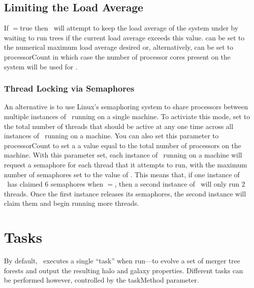 \subsection{Limiting the Load Average}

If {\normalfont \ttfamily [treeEvolveLimitLoadAverage]}$=${\normalfont \ttfamily true} then \glc\ will attempt to keep the load average of the system under {\normalfont \ttfamily [treeEvolveLoadAverageMaximum]} by waiting to run trees if the current load average exceeds this value. {\normalfont \ttfamily [treeEvolveLoadAverageMaximum]} can be set to the numerical maximum load average desired or, alternatively, can be set to {\normalfont \ttfamily processorCount} in which case the number of processor cores present on the system will be used for {\normalfont \ttfamily [treeEvolveLoadAverageMaximum]}.

\subsubsection{Thread Locking via Semaphores}\label{sec:Semaphores}

An alternative is to use Linux's semaphoring system to share processors between multiple instances of \glc\ running on a single machine. To activiate this mode, set {\normalfont \ttfamily [treeEvolveThreadLock]} to the total number of threads that should be active at any one time across all instances of \glc\ running on a machine. You can also set this parameter to {\normalfont \ttfamily processorCount} to set a a value equal to the total number of processors on the machine. With this parameter set, each instance of \glc\ running on a machine will request a semaphore for each thread that it attempts to run, with the maximum number of semaphores set to the value of {\normalfont \ttfamily [treeEvolveThreadLock]}. This means that, if one instance of \glc\ has claimed 6 semaphores when {\normalfont \ttfamily [treeEvolveThreadLock]}$=${\normalfont {}}, then a second instance of \glc\ will only run 2 threads. Once the first instance releases its semaphores, the second instance will claim them and begin running more threads.

\section{Tasks}

By default, \glc\ executes a single ``task'' when run---to evolve a set of merger tree forests and output the resulting halo and galaxy properties. Different tasks can be performed however, controlled by the {\normalfont \ttfamily taskMethod} parameter.

